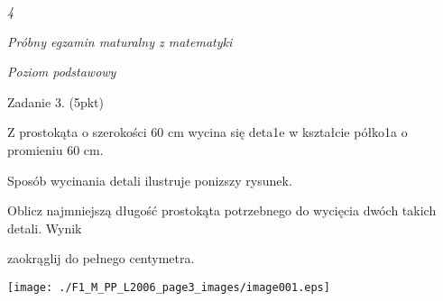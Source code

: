 \documentclass[a4paper,12pt]{article}
\begin{document}
{\it 4}

{\it Próbny egzamin maturalny z matematyki}

{\it Poziom podstawowy}

Zadanie 3. (5pkt)

Z prostokąta o szerokości 60 cm wycina się deta1e w kształcie półko1a o promieniu 60 cm.

Sposób wycinania detali ilustruje ponizszy rysunek.

Oblicz najmniejszą długość prostokąta potrzebnego do wycięcia dwóch takich detali. Wynik

zaokrąglij do pełnego centymetra.
\begin{center}
\texttt{[image: ./F1\_M\_PP\_L2006\_page3\_images/image001.eps]}
\end{center}
\end{document}
